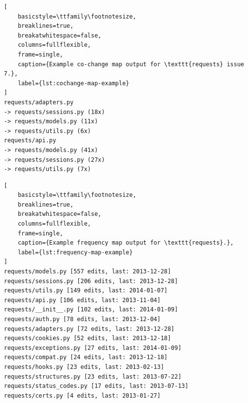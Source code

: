 
\begin{lstlisting}[
    basicstyle=\ttfamily\footnotesize,
    breaklines=true,
    breakatwhitespace=false,
    columns=fullflexible,
    frame=single,
    caption={Example co-change map output for \texttt{requests} issue 7.},
    label={lst:cochange-map-example}
]
requests/adapters.py
-> requests/sessions.py (18x)
-> requests/models.py (11x)
-> requests/utils.py (6x)
requests/api.py
-> requests/models.py (41x)
-> requests/sessions.py (27x)
-> requests/utils.py (7x)
\end{lstlisting}

\begin{lstlisting}[
    basicstyle=\ttfamily\footnotesize,
    breaklines=true,
    breakatwhitespace=false,
    columns=fullflexible,
    frame=single,
    caption={Example frequency map output for \texttt{requests}.},
    label={lst:frequency-map-example}
]
requests/models.py [557 edits, last: 2013-12-28]
requests/sessions.py [206 edits, last: 2013-12-28]
requests/utils.py [149 edits, last: 2014-01-07]
requests/api.py [106 edits, last: 2013-11-04]
requests/__init__.py [102 edits, last: 2014-01-09]
requests/auth.py [78 edits, last: 2013-12-04]
requests/adapters.py [72 edits, last: 2013-12-28]
requests/cookies.py [52 edits, last: 2013-12-18]
requests/exceptions.py [27 edits, last: 2014-01-09]
requests/compat.py [24 edits, last: 2013-12-18]
requests/hooks.py [23 edits, last: 2013-02-13]
requests/structures.py [23 edits, last: 2013-07-22]
requests/status_codes.py [17 edits, last: 2013-07-13]
requests/certs.py [4 edits, last: 2013-01-27]
\end{lstlisting}

